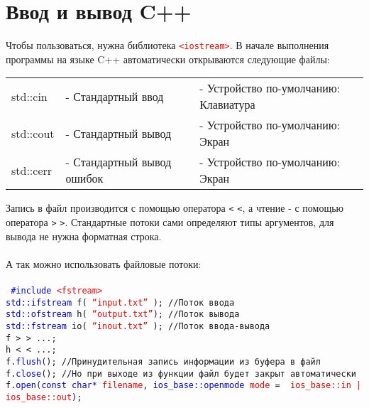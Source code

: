 \documentclass {article}
\begin{document}
\section{Ввод и вывод C++}
Чтобы пользоваться, нужна библиотека \textcolor{red}{\texttt{<iostream>}}. 
В начале выполнения программы на языке C++ автоматически открываются следующие файлы:\\
\begin{center}
\begin{tabular} {l l l}
std::cin   &  - Стандартный ввод       &      - Устройство по-умолчанию: Клавиатура \\
std::cout  &   - Стандартный вывод      &      - Устройство по-умолчанию: Экран \\
std::cerr   &  - Стандартный вывод ошибок    &   - Устройство по-умолчанию: Экран \\
\end{tabular}
\end{center}
Запись в файл производится с помощью оператора \texttt{<} \texttt{<}, а чтение - с помощью оператора \texttt{>} \texttt{>}.
Стандартные потоки сами определяют типы аргументов, для вывода не нужна форматная строка.\\ \\
А так можно использовать файловые потоки:\\
\\
\texttt{
\textcolor{blue}{\#include} \textcolor{red}{<fstream>} \\
\textcolor{blue}{std::ifstream} f(  \textcolor{red}{``input.txt''} );     //Поток ввода \\
\textcolor{blue}{std::ofstream} h(  \textcolor{red}{``output.txt''});     //Поток вывода \\
\textcolor{blue}{std::fstream} io(  \textcolor{red}{``inout.txt''} );     //Поток ввода-вывода \\
f > > ...;\\
h < < ...;\\
f.\textcolor{blue}{flush}();        //Принудительная запись информации из буфера в файл\\
f.\textcolor{blue}{close}();         //Но при выходе из функции файл будет закрыт автоматически\\
f.\textcolor{blue}{open}(\textcolor{blue}{const char*} \textcolor{red}{filename},\textcolor{blue}{ ios\_base::openmode} \textcolor{red}{mode} = \textcolor{red}{ ios\_base::in | ios\_base::out});\\
}
\end{document}
